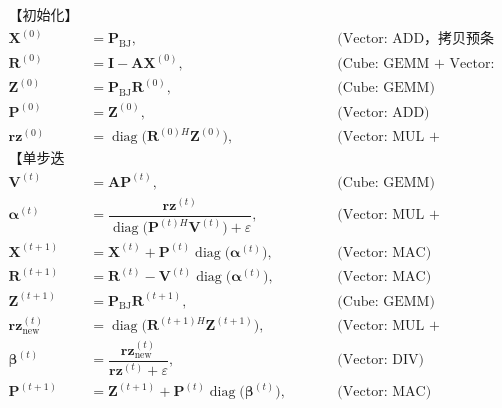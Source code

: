 \documentclass{CjC}
\begin{document}
    \begin{equation}
        \boxed{
            \begin{aligned} 
                \text{【初始化】}&                                                                                                                              \\
                \bm{X}^{(0)}     & = \bm{P}_{\text{BJ}}, \qquad &&\text{(Vector: ADD，拷贝预条件器)}                                                             \\
                \bm{R}^{(0)}     & = \bm{I} - \bm{A}\bm{X}^{(0)}, \qquad &&\text{(Cube: GEMM + Vector: MAC)}                                                  \\
                \bm{Z}^{(0)}     & = \bm{P}_{\text{BJ}}\bm{R}^{(0)}, \qquad &&\text{(Cube: GEMM)}                                                              \\
                \bm{P}^{(0)}     & = \bm{Z}^{(0)}, \qquad &&\text{(Vector: ADD)}                                                                                 \\
                \bm{rz}^{(0)}    & = \operatorname{diag}\big(\bm{R}^{(0)H}\bm{Z}^{(0)}\big), \qquad &&\text{(Vector: MUL + ADDTREE)}                            \\[4pt]
                \text{【单步迭代】}&                                                                                                                              \\
                \bm{V}^{(t)}     & = \bm{A}\bm{P}^{(t)}, \qquad &&\text{(Cube: GEMM)}                                                                           \\
                \bm{\alpha}^{(t)}& = \dfrac{\bm{rz}^{(t)}}
                {\operatorname{diag}\big(\bm{P}^{(t)H}\bm{V}^{(t)}\big)+\varepsilon}, \qquad &&\text{(Vector: MUL + ADDTREE + DIV)} \\
                \bm{X}^{(t+1)}   & = \bm{X}^{(t)} + \bm{P}^{(t)}\operatorname{diag}\big(\bm{\alpha}^{(t)}\big), \qquad &&\text{(Vector: MAC)}                     \\
                \bm{R}^{(t+1)}   & = \bm{R}^{(t)} - \bm{V}^{(t)}\operatorname{diag}\big(\bm{\alpha}^{(t)}\big), \qquad &&\text{(Vector: MAC)}                     \\
                \bm{Z}^{(t+1)}   & = \bm{P}_{\text{BJ}}\bm{R}^{(t+1)}, \qquad &&\text{(Cube: GEMM)}                                                             \\
                \bm{rz}_{\text{new}}^{(t)} & = \operatorname{diag}\big(\bm{R}^{(t+1)H}\bm{Z}^{(t+1)}\big), \qquad &&\text{(Vector: MUL + ADDTREE)}               \\
                \bm{\beta}^{(t)} & = \dfrac{\bm{rz}_{\text{new}}^{(t)}}{\bm{rz}^{(t)}+\varepsilon}, \qquad &&\text{(Vector: DIV)}                                \\
                \bm{P}^{(t+1)}   & = \bm{Z}^{(t+1)} + \bm{P}^{(t)}\operatorname{diag}\big(\bm{\beta}^{(t)}\big), \qquad &&\text{(Vector: MAC)}
            \end{aligned}
        }
        \label{eq:pcg-full}
    \end{equation}
\end{document}
